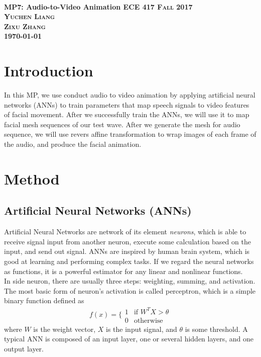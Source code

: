\documentclass{article}
\begin{document}
	
	\everymath{\displaystyle}
	\begin{titlepage}	 	
		\center
		\text{}\\[3cm]
		\linespread{2}\huge \bfseries MP7: Audio-to-Video Animation
		\center\textsc{\Large ECE 417 Fall 2017}\\[1cm]
		\Large\center\textsc{Yuchen Liang\\ Zixu Zhang  }\\[1.4cm]
		\Large \today\\
		\vfill
	\end{titlepage}
	\setlength{\baselineskip}{24pt}
	\onehalfspacing
	\section{Introduction}
	In this MP, we use conduct audio to video animation by applying artificial neural networks (ANNs) to train parameters that map speech signals to video features of facial movement. After we successfully train the ANNs, we will use it to map facial mesh sequences of our test wave. After we generate the mesh for audio sequence, we will use revers affine transformation to wrap images of each frame of the audio, and produce the facial animation.
	
	\section{Method}
	\subsection{Artificial Neural Networks (ANNs)}
	Artificial Neural Networks are network of its element \textit{neurons}, which is able to receive signal input from another neuron, execute some calculation based on the input, and send out signal. ANNs are inspired by human brain system, which is good at learning and performing complex tasks. If we regard the neural networks as functions, it is a powerful estimator for any linear and nonlinear functions.  \\
	In side neuron, there are usually three steps: weighting, summing, and activation. The most basic form of neuron's activation is called perceptron, which is a simple binary function defined as
	\begin{equation}
	f(x)=\bigg\{\begin{array}{cc}
	1 & \text{if }W^TX>\theta\\
	0 & \text{otherwise}
	\end{array}
	\end{equation}
	where $W$ is the weight vector, $X$ is the input signal, and $\theta$ is some threshold. A typical ANN is composed of an input layer, one or several hidden layers, and one output layer.
\end{document}
